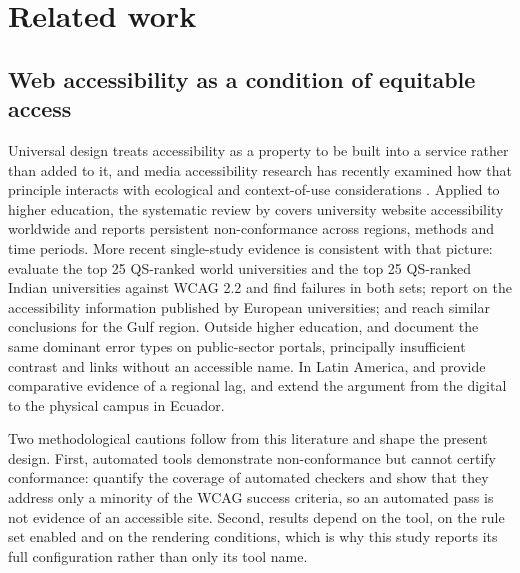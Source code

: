 \documentclass[pdflatex,sn-basic,Numbered]{sn-jnl}
\theoremstyle{thmstyleone}
\theoremstyle{thmstyletwo}
\theoremstyle{thmstylethree}
\begin{document}
\section{Related work}\label{sec:related}

\subsection{Web accessibility as a condition of equitable access}\label{sec:related-a11y}

Universal design treats accessibility as a property to be built into a service rather than added to it, and media accessibility research has recently examined how that principle interacts with ecological and context-of-use considerations \citep{hermosaramirez2025universal}. Applied to higher education, the systematic review by \citet{campoverdemolina2023accessibility} covers university website accessibility worldwide and reports persistent non-conformance across regions, methods and time periods. More recent single-study evidence is consistent with that picture: \citet{krittika2025accessibility} evaluate the top 25 QS-ranked world universities and the top 25 QS-ranked Indian universities against WCAG 2.2 and find failures in both sets; \citet{krejtz2025higher} report on the accessibility information published by European universities; and \citet{fakrudeen2025evaluation} reach similar conclusions for the Gulf region. Outside higher education, \citet{aljedaani2025egovernment} and \citet{iniesto2025service} document the same dominant error types on public-sector portals, principally insufficient contrast and links without an accessible name. In Latin America, \citet{acostavargas2020dataset} and \citet{acostavargas2020improve} provide comparative evidence of a regional lag, and \citet{maldonadogarces2025physical} extend the argument from the digital to the physical campus in Ecuador.

Two methodological cautions follow from this literature and shape the present design. First, automated tools demonstrate non-conformance but cannot certify conformance: \citet{fischer2025coverage} quantify the coverage of automated checkers and show that they address only a minority of the WCAG success criteria, so an automated pass is not evidence of an accessible site. Second, results depend on the tool, on the rule set enabled and on the rendering conditions, which is why this study reports its full configuration rather than only its tool name.
\end{document}
